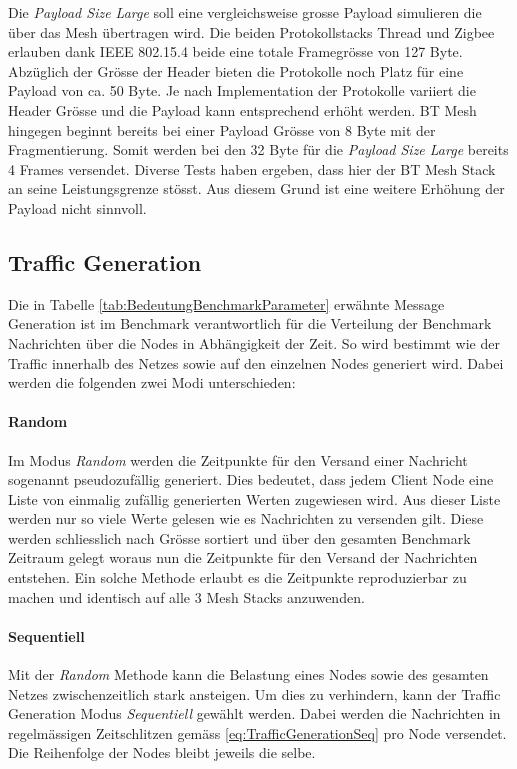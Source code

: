 Die \textit{Payload Size Large} soll eine vergleichsweise grosse Payload simulieren die über das Mesh übertragen wird.
Die beiden Protokollstacks Thread und Zigbee erlauben dank IEEE 802.15.4 beide eine totale Framegrösse von 127 Byte.
Abzüglich der Grösse der Header bieten die Protokolle noch Platz für eine Payload von ca. 50 Byte. Je nach Implementation der Protokolle variiert die Header Grösse und die Payload kann entsprechend erhöht werden.
BT Mesh hingegen beginnt bereits bei einer Payload Grösse von 8 Byte mit der Fragmentierung. Somit werden bei den 32 Byte für die \textit{Payload Size Large} bereits 4 Frames versendet. Diverse Tests haben ergeben, dass hier der BT Mesh Stack an seine Leistungsgrenze stösst.
Aus diesem Grund ist eine weitere Erhöhung der Payload nicht sinnvoll.





\subsection{Traffic Generation}\label{subsec:TrafficGeneration}

Die in Tabelle \ref{tab:BedeutungBenchmarkParameter} erwähnte Message Generation ist im Benchmark verantwortlich für die Verteilung der Benchmark Nachrichten über die Nodes in Abhängigkeit der Zeit. So wird bestimmt wie der Traffic innerhalb des Netzes sowie auf den einzelnen Nodes generiert wird.
Dabei werden die folgenden zwei Modi unterschieden:

\paragraph{Random}\label{par:Random}
Im Modus \textit{Random} werden die Zeitpunkte für den Versand einer Nachricht sogenannt pseudozufällig generiert. Dies bedeutet, dass jedem Client Node eine Liste von einmalig zufällig generierten Werten zugewiesen wird.
Aus dieser Liste werden nur so viele Werte gelesen wie es Nachrichten zu versenden gilt. Diese werden schliesslich nach Grösse sortiert und über den gesamten Benchmark Zeitraum gelegt woraus nun die Zeitpunkte für den Versand der Nachrichten entstehen.
Ein solche Methode erlaubt es die Zeitpunkte reproduzierbar zu machen und identisch auf alle 3 Mesh Stacks anzuwenden.

\paragraph{Sequentiell}\label{par:Sequentiell}
Mit der \textit{Random} Methode kann die Belastung eines Nodes sowie des gesamten Netzes zwischenzeitlich stark ansteigen.
Um dies zu verhindern, kann der Traffic Generation Modus \textit{Sequentiell} gewählt werden.
Dabei werden die Nachrichten in regelmässigen Zeitschlitzen gemäss \ref{eq:TrafficGenerationSeq} pro Node versendet. Die Reihenfolge der Nodes bleibt jeweils die selbe.


